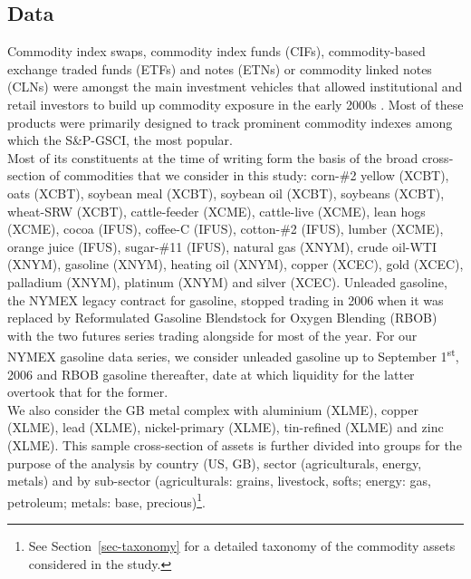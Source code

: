 \documentclass[
  authoryear,
  preprint,
  3p]{elsarticle}
\begin{document}
\subsection{Data}\label{sec-data}

Commodity index swaps, commodity index funds (CIFs), commodity-based
exchange traded funds (ETFs) and notes (ETNs) or commodity linked notes
(CLNs) were amongst the main investment vehicles that allowed
institutional and retail investors to build up commodity exposure in the
early 2000s
\citep{boons_stock_2012, henderson_new_2015, irwin_index_2011, unctad_global_2009, schumann_hunger_2011}.
Most of these products were primarily designed to track prominent
commodity indexes among which the S\&P-GSCI, the most popular.\\
Most of its constituents at the time of writing form the basis of the
broad cross-section of commodities that we consider in this study:
corn-\#2 yellow (XCBT), oats (XCBT), soybean meal (XCBT), soybean oil
(XCBT), soybeans (XCBT), wheat-SRW (XCBT), cattle-feeder (XCME),
cattle-live (XCME), lean hogs (XCME), cocoa (IFUS), coffee-C (IFUS),
cotton-\#2 (IFUS), lumber (XCME), orange juice (IFUS), sugar-\#11
(IFUS), natural gas (XNYM), crude oil-WTI (XNYM), gasoline (XNYM),
heating oil (XNYM), copper (XCEC), gold (XCEC), palladium (XNYM),
platinum (XNYM) and silver (XCEC). Unleaded gasoline, the NYMEX legacy
contract for gasoline, stopped trading in 2006 when it was replaced by
Reformulated Gasoline Blendstock for Oxygen Blending (RBOB) with the two
futures series trading alongside for most of the year. For our NYMEX
gasoline data series, we consider unleaded gasoline up to September
1\textsuperscript{st}, 2006 and RBOB gasoline thereafter, date at which
liquidity for the latter overtook that for the former.\\
We also consider the GB metal complex with aluminium (XLME), copper
(XLME), lead (XLME), nickel-primary (XLME), tin-refined (XLME) and zinc
(XLME). This sample cross-section of assets is further divided into
groups for the purpose of the analysis by country (US, GB), sector
(agriculturals, energy, metals) and by sub-sector (agriculturals:
grains, livestock, softs; energy: gas, petroleum; metals: base,
precious)\footnote{See Section~\ref{sec-taxonomy} for a detailed
  taxonomy of the commodity assets considered in the study.}.

\medskip
\end{document}
